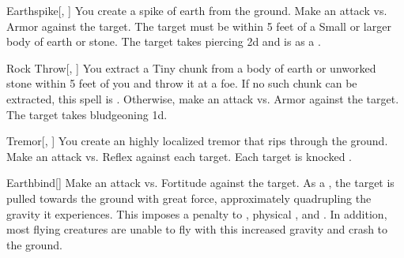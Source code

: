 \lowercase{\hypertarget{spell:Earthspike}{}}\label{spell:Earthspike}
\begin{freeability}[Rank 1]{\hypertarget{spell:Earthspike}{Earthspike}}[, ]
You create a spike of earth from the ground.
Make an attack vs. Armor against the target.
The target must be within 5 feet of a Small or larger body of earth or stone.
\hit The target takes piercing  \minus2d and is  as a .
\end{freeability}
\vspace{0.25em}



\lowercase{\hypertarget{spell:Rock Throw}{}}\label{spell:Rock Throw}
\begin{freeability}[Rank 1]{\hypertarget{spell:Rock Throw}{Rock Throw}}[, ]
You extract a Tiny chunk from a body of earth or unworked stone within 5 feet of you and throw it at a foe.
If no such chunk can be extracted, this spell is .
Otherwise, make an attack vs. Armor against the target.
\hit The target takes bludgeoning  \plus1d.
\end{freeability}
\vspace{0.25em}



\lowercase{\hypertarget{spell:Tremor}{}}\label{spell:Tremor}
\begin{freeability}[Rank 1]{\hypertarget{spell:Tremor}{Tremor}}[, ]
You create an highly localized tremor that rips through the ground.
Make an attack vs. Reflex against each target.
\hit Each target is knocked .
\end{freeability}
\vspace{0.25em}



\lowercase{\hypertarget{spell:Earthbind}{}}\label{spell:Earthbind}
\begin{freeability}[Rank 3]{\hypertarget{spell:Earthbind}{Earthbind}}[]
Make an attack vs. Fortitude against the target.
\hit As a , the target is pulled towards the ground with great force, approximately quadrupling the gravity it experiences.
This imposes a  penalty to , physical , and .
In addition, most flying creatures are unable to fly with this increased gravity and crash to the ground.
\end{freeability}
\vspace{0.25em}



